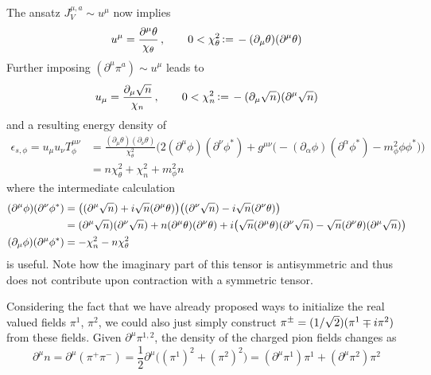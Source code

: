 The ansatz $J_V^{\mu,a}\sim u^\mu$ now implies
\begin{equation}
    u^\mu=\frac{\partial^\mu\theta}{\chi_\theta}\,,\qquad 0<\chi_\theta^2{\,\vcentcolon=\,}-(\partial_\mu\theta)(\partial^\mu\theta)
\end{equation}
Further imposing $(\partial^\mu\pi^a)\sim u^\mu$ leads to 
\begin{equation}
    u_\mu=\frac{\partial_\mu\sqrt{n}}{\chi_n}\,,\qquad 0<\chi_n^2{\,\vcentcolon=\,}-(\partial_\mu\sqrt{n})(\partial^\mu\sqrt{n})
\end{equation}
and a resulting energy density of
\begin{subequations}
    \begin{align}
        \epsilon_{s,\phi}=u_\mu u_\nu T^{\mu\nu}_{\phi}&=\frac{(\partial_\mu\theta)(\partial_\nu\theta)}{\chi_\theta^2}\Big(2(\partial^\mu\phi)(\partial^\nu\phi^*)+g^{\mu\nu}\big(-(\partial_\alpha\phi)(\partial^\alpha\phi^*)-m_\phi^2\phi\phi^*\big)\Big)\\
        &=n\chi_\theta^2+\chi^2_n+m_\phi^2n
    \end{align}
\end{subequations}
where the intermediate calculation
\begin{subequations}
    \begin{align}
        (\partial^\mu\phi)(\partial^\nu\phi^*)&=\big((\partial^\mu\sqrt{n})+{i}\sqrt{n}(\partial^\mu\theta)\big)\big((\partial^\nu\sqrt{n})-{i}\sqrt{n}(\partial^\nu\theta)\big)\\
        &=(\partial^\mu\sqrt{n})(\partial^\nu\sqrt{n})+n(\partial^\mu\theta)(\partial^\nu\theta)+{i}\big(\sqrt{n}(\partial^\mu\theta)(\partial^\nu\sqrt{n})-\sqrt{n}(\partial^\nu\theta)(\partial^\mu\sqrt{n})\big)\\
        (\partial_\mu\phi)(\partial^\mu\phi^*)&=-\chi_n^2-n\chi_\theta^2
    \end{align}
\end{subequations}
is useful. Note how the imaginary part of this tensor is antisymmetric and thus does not contribute upon contraction with a symmetric tensor.

Considering the fact that we have already proposed ways to initialize the real valued fields $\pi^1$, $\pi^2$, we could also just simply construct $\pi^\pm=(1/\sqrt{2})(\pi^1\mp{i}\pi^2)$ from these fields. Given $\partial^\mu\pi^{1,2}$, the density of the charged pion fields changes as
\begin{equation}
    \partial^\mu n=\partial^\mu(\pi^+\pi^-)=\frac{1}{2}\partial^\mu\big((\pi^1)^2+(\pi^2)^2\big)=(\partial^\mu\pi^1)\pi^1+(\partial^\mu\pi^2)\pi^2
\end{equation}

